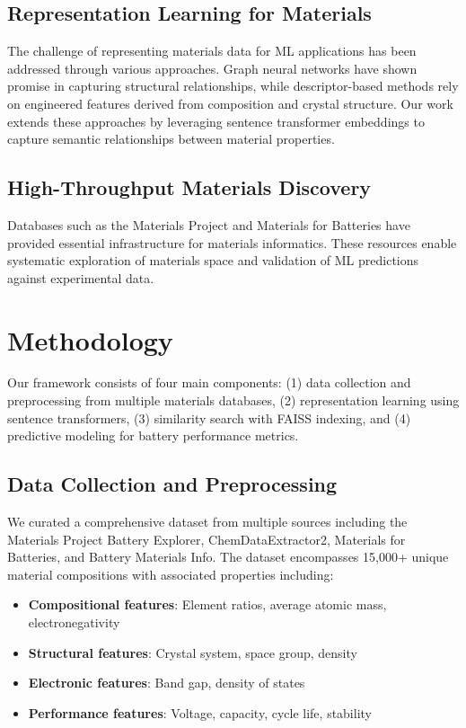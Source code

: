 \documentclass{article}
\begin{document}
\subsection{Representation Learning for Materials}

The challenge of representing materials data for ML applications has been addressed through various approaches. Graph neural networks have shown promise in capturing structural relationships, while descriptor-based methods rely on engineered features derived from composition and crystal structure. Our work extends these approaches by leveraging sentence transformer embeddings to capture semantic relationships between material properties.

\subsection{High-Throughput Materials Discovery}

Databases such as the Materials Project \cite{jain2013commentary} and Materials for Batteries \cite{batterymaterials} have provided essential infrastructure for materials informatics. These resources enable systematic exploration of materials space and validation of ML predictions against experimental data.

\section{Methodology}

Our framework consists of four main components: (1) data collection and preprocessing from multiple materials databases, (2) representation learning using sentence transformers, (3) similarity search with FAISS indexing, and (4) predictive modeling for battery performance metrics.

\subsection{Data Collection and Preprocessing}

We curated a comprehensive dataset from multiple sources including the Materials Project Battery Explorer, ChemDataExtractor2, Materials for Batteries, and Battery Materials Info. The dataset encompasses 15,000+ unique material compositions with associated properties including:

\begin{itemize}
\item \textbf{Compositional features}: Element ratios, average atomic mass, electronegativity
\item \textbf{Structural features}: Crystal system, space group, density
\item \textbf{Electronic features}: Band gap, density of states
\item \textbf{Performance features}: Voltage, capacity, cycle life, stability
\end{itemize}
\end{document}
